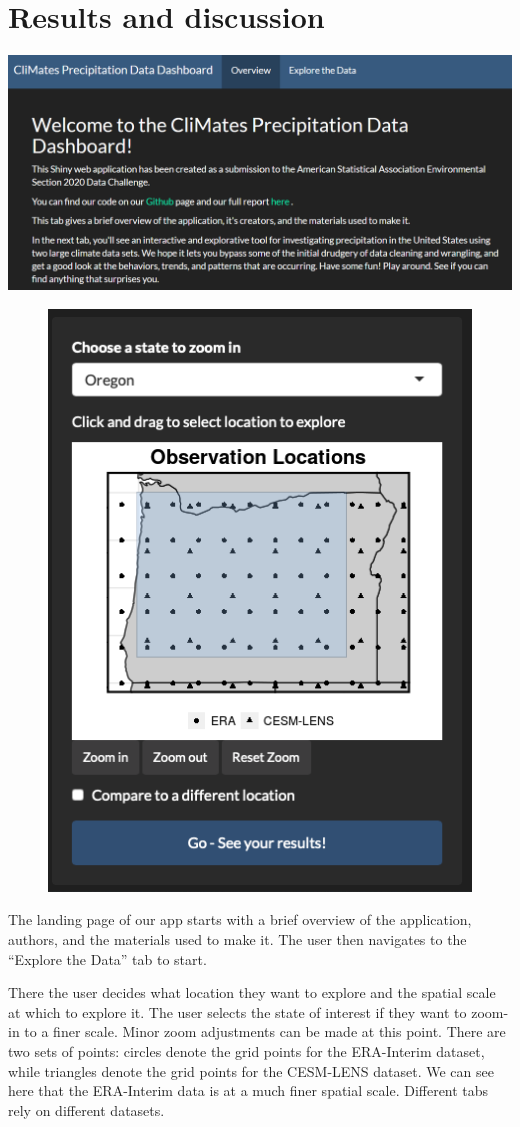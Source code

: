 \documentclass[10pt,letterpaper]{article}
\begin{document}
\section*{Results and discussion}

\begin{center}
  \includegraphics[width = .9\textwidth]{graphics/overview}
\end{center}


\begin{figure}

  \includegraphics[width=.45\textwidth]{graphics/brushedpoints}
\end{figure}

The landing page of our app starts with a brief overview of the application, authors, and the materials used to make it. The user then navigates to the “Explore the Data” tab to start.




There the user decides what location they want to explore and the spatial scale at which to explore it. The user selects the state of interest if they want to zoom-in to a finer scale. Minor zoom adjustments can be made at this point. There are two sets of points: circles denote the grid points for the ERA-Interim dataset, while triangles denote the grid points for the CESM-LENS dataset. We can see here that the ERA-Interim data is at a much finer spatial scale. Different tabs rely on different datasets.
\end{document}

